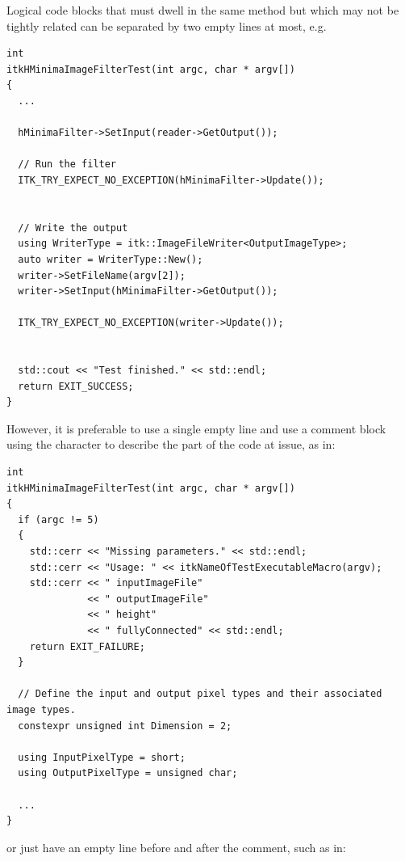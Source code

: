 Logical code blocks that must dwell in the same method but which may not be
tightly related can be separated by two empty lines at most, e.g.

\small
\begin{verbatim}
int
itkHMinimaImageFilterTest(int argc, char * argv[])
{
  ...

  hMinimaFilter->SetInput(reader->GetOutput());

  // Run the filter
  ITK_TRY_EXPECT_NO_EXCEPTION(hMinimaFilter->Update());


  // Write the output
  using WriterType = itk::ImageFileWriter<OutputImageType>;
  auto writer = WriterType::New();
  writer->SetFileName(argv[2]);
  writer->SetInput(hMinimaFilter->GetOutput());

  ITK_TRY_EXPECT_NO_EXCEPTION(writer->Update());


  std::cout << "Test finished." << std::endl;
  return EXIT_SUCCESS;
}
\end{verbatim}
\normalsize


However, it is preferable to use a single empty line and use a comment block
using the \code{//} character to describe the part of the code at issue, as
in:

\small
\begin{verbatim}
int
itkHMinimaImageFilterTest(int argc, char * argv[])
{
  if (argc != 5)
  {
    std::cerr << "Missing parameters." << std::endl;
    std::cerr << "Usage: " << itkNameOfTestExecutableMacro(argv);
    std::cerr << " inputImageFile"
              << " outputImageFile"
              << " height"
              << " fullyConnected" << std::endl;
    return EXIT_FAILURE;
  }

  // Define the input and output pixel types and their associated image types.
  constexpr unsigned int Dimension = 2;

  using InputPixelType = short;
  using OutputPixelType = unsigned char;

  ...
}
\end{verbatim}
\normalsize

or just have an empty line before and after the comment, such as in:

